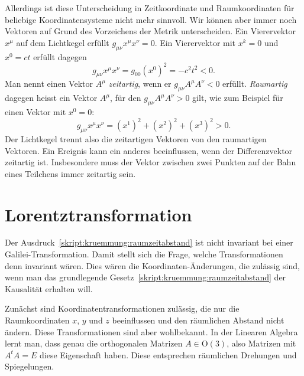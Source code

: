 Allerdings ist diese Unterscheidung in Zeitkoordinate und Raumkoordinaten
für beliebige Koordinatensysteme nicht mehr sinnvoll.
Wir können aber immer noch Vektoren auf Grund des Vorzeichens der 
Metrik unterscheiden.
Ein Vierervektor $x^\mu$ auf dem Lichtkegel erfüllt $g_{\mu\nu}x^\mu x^\nu=0$.
Ein Vierervektor  mit $x^k=0$ und $x^0=ct$ erfüllt dagegen
\[
g_{\mu\nu} x^\mu x^\nu
=
g_{00}(x^0)^2 = -c^2 t^2<0.
\]
Man nennt einen Vektor $A^\mu$ {\em zeitartig},
wenn er $g_{\mu\nu}A^\mu A^\nu<0$ 
erfüllt.
%
%
{\em Raumartig} dagegen heisst ein Vektor $A^\mu$, für den
$g_{\mu\nu} A^\mu A^\nu>0$
gilt, wie zum Beispiel für einen Vektor mit $x^0=0$:
\[
g_{\mu\nu}x^\mu x^\nu
=
(x^1)^2
+
(x^2)^2
+
(x^3)^2
>0.
\]
Der Lichtkegel trennt also die zeitartigen Vektoren von den raumartigen
Vektoren.
Ein Ereignis kann ein anderes beeinflussen, wenn der Differenzvektor
zeitartig ist.
Insbesondere muss der Vektor zwischen zwei Punkten auf der Bahn 
eines Teilchens immer zeitartig sein.

\section{Lorentztransformation%
\label{skript:speziell:section:lorentztransformation}}
Der Ausdruck~\eqref{skript:kruemmung:raumzeitabstand} ist nicht
invariant bei einer Galilei-Transformation.
Damit stellt sich die Frage, welche Transformationen denn
invariant wären.
Dies wären die Koordinaten-Änderungen, die zulässig sind, wenn
man das grundlegende Gesetz~\eqref{skript:kruemmung:raumzeitabstand}
der Kausalität erhalten will.

Zunächst sind Koordinatentransformationen zulässig, die nur die Raumkoordinaten
$x$, $y$ und $z$ beeinflussen und den räumlichen Abstand nicht ändern.
Diese Transformationen sind aber wohlbekannt.
In der Linearen Algebra lernt man, dass genau die orthogonalen
Matrizen $A\in \textrm{O}(3)$, also Matrizen mit $A^tA=E$ diese
Eigenschaft haben.
Diese entsprechen räumlichen Drehungen und Spiegelungen.

